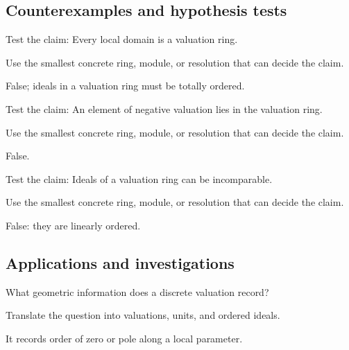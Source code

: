 \subsection*{Counterexamples and hypothesis tests}

\begin{exercise}\label{exr:v21-expand-10}
Test the claim: Every local domain is a valuation ring.
\end{exercise}
\begin{hint}
Use the smallest concrete ring, module, or resolution that can decide the claim.
\end{hint}
\begin{solution}
False; ideals in a valuation ring must be totally ordered.
\end{solution}

\begin{exercise}\label{exr:v21-expand-11}
Test the claim: An element of negative valuation lies in the valuation ring.
\end{exercise}
\begin{hint}
Use the smallest concrete ring, module, or resolution that can decide the claim.
\end{hint}
\begin{solution}
False.
\end{solution}

\begin{exercise}\label{exr:v21-expand-12}
Test the claim: Ideals of a valuation ring can be incomparable.
\end{exercise}
\begin{hint}
Use the smallest concrete ring, module, or resolution that can decide the claim.
\end{hint}
\begin{solution}
False: they are linearly ordered.
\end{solution}

\subsection*{Applications and investigations}

\begin{exercise}\label{exr:v21-expand-13}
What geometric information does a discrete valuation record?
\end{exercise}
\begin{hint}
Translate the question into valuations, units, and ordered ideals.
\end{hint}
\begin{solution}
It records order of zero or pole along a local parameter.
\end{solution}

